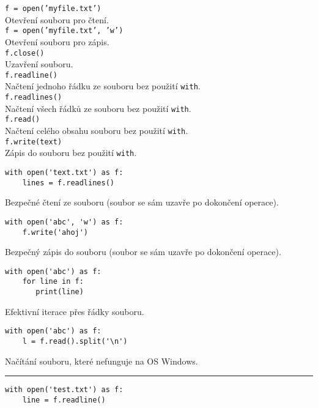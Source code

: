 \documentclass[12pt,a4paper]{article}
\begin{document}
\pagestyle{empty}

\setlength\parindent{0pt}
\setlength{\columnsep}{60pt}
\begin{multicols}{2}

\Large

\texttt{f = open('myfile.txt')}\\

Otevření souboru pro čtení.\\

\texttt{f = open('myfile.txt', 'w')}\\

Otevření souboru pro zápis.\\

\texttt{f.close()}\\

Uzavření souboru.\\

\texttt{f.readline()}\\

Načtení jednoho řádku ze souboru bez použití \texttt{with}.\\

\texttt{f.readlines()}\\

Načtení všech řádků ze souboru bez použití \texttt{with}.\\

\texttt{f.read()}\\

Načtení celého obsahu souboru bez použití \texttt{with}.\\

\texttt{f.write(text)}\\

Zápis do souboru bez použití \texttt{with}.

\begin{verbatim}
with open('text.txt') as f:
    lines = f.readlines()
\end{verbatim}

Bezpečné čtení ze souboru (soubor se sám uzavře po dokončení operace).

\begin{verbatim}
with open('abc', 'w') as f:
    f.write('ahoj')
\end{verbatim}

Bezpečný zápis do souboru (soubor se sám uzavře po dokončení operace).\\

\begin{verbatim}
with open('abc') as f:
    for line in f:
       print(line)
\end{verbatim}

Efektivní iterace přes řádky souboru.

\begin{verbatim}
with open('abc') as f:
    l = f.read().split('\n')
\end{verbatim}

Načítání souboru, které nefunguje na OS Windows.

\rule{\linewidth}{1pt}

\begin{verbatim}
with open('test.txt') as f:
    line = f.readline()
\end{verbatim}

\end{multicols}
\end{document}
